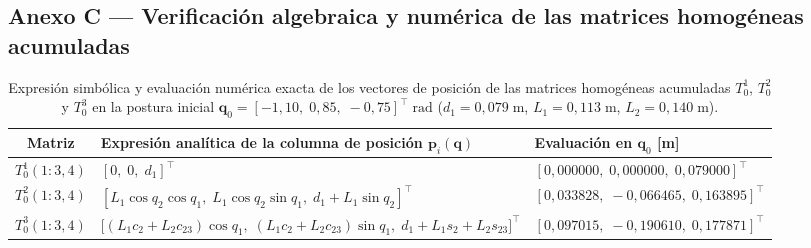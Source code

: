 \documentclass[11pt,a4paper]{article}
\newcommand{\T}{^{\!\top}}
\begin{document}
\subsection{Anexo C --- Verificación algebraica y numérica de las matrices homogéneas acumuladas}

\begin{table}[!htbp]
\centering
\caption{Expresión simbólica y evaluación numérica exacta de los vectores de posición de las matrices homogéneas acumuladas $T_{0}^{1}$, $T_{0}^{2}$ y $T_{0}^{3}$ en la postura inicial $\bm{q}_{0}=[-1{,}10,\;0{,}85,\;-0{,}75]\T\;\text{rad}$ ($d_{1}=0{,}079\;\text{m}$, $L_{1}=0{,}113\;\text{m}$, $L_{2}=0{,}140\;\text{m}$).}\label{tab:verif}
\footnotesize
\setlength{\tabcolsep}{4pt}
\begin{tabular}{c l l}
\toprule
\textbf{Matriz} & \textbf{Expresión analítica de la columna de posición} $\bm{p}_{i}(\bm{q})$ & \textbf{Evaluación en} $\bm{q}_{0}$ {[m]} \\
\midrule
$T_{0}^{1}(1:3,4)$ & $[0,\;0,\;d_{1}]\T$ & $[0{,}000000,\;0{,}000000,\;0{,}079000]\T$ \\[3pt]
$T_{0}^{2}(1:3,4)$ & $[L_{1}\cos q_{2}\cos q_{1},\;L_{1}\cos q_{2}\sin q_{1},\;d_{1}+L_{1}\sin q_{2}]\T$ & $[0{,}033828,\;-0{,}066465,\;0{,}163895]\T$ \\[3pt]
$T_{0}^{3}(1:3,4)$ & $\bigl[(L_{1}c_{2}+L_{2}c_{23})\cos q_{1},\;(L_{1}c_{2}+L_{2}c_{23})\sin q_{1},\;d_{1}+L_{1}s_{2}+L_{2}s_{23}\bigr]\T$ & $[0{,}097015,\;-0{,}190610,\;0{,}177871]\T$ \\
\bottomrule
\end{tabular}
\end{table}
\end{document}
